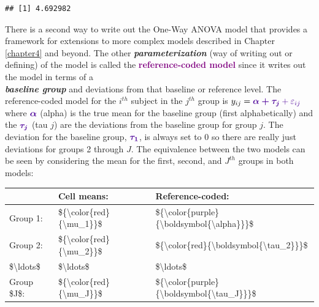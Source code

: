\documentclass[]{book}
\newenvironment{Shaded}{\begin{snugshade}}{\end{snugshade}}
\newcommand{\KeywordTok}[1]{\textcolor[rgb]{0.13,0.29,0.53}{\textbf{#1}}}
\newcommand{\OperatorTok}[1]{\textcolor[rgb]{0.81,0.36,0.00}{\textbf{#1}}}
\newcommand{\NormalTok}[1]{#1}
\theoremstyle{definition}
\theoremstyle{definition}
\theoremstyle{remark}
\begin{document}
\begin{Shaded}
\end{Shaded}

\begin{verbatim}
## [1] 4.692982
\end{verbatim}

There is a second way to write out the One-Way ANOVA model that provides
a framework for extensions to more complex models described in Chapter
\ref{chapter4} and beyond. The other \textbf{\emph{parameterization}}
(way of writing out or defining) of the model is called the
\textcolor{purple}{\textbf{reference-coded model}} since it writes out
the model in terms of a\\
\textbf{\emph{baseline group}} and deviations from that baseline or
reference level. The reference-coded model for the \(i^{th}\) subject in
the \(j^{th}\) group is
\(y_{ij} =\color{purple}{\boldsymbol{\alpha + \tau_j}}+\varepsilon_{ij}\)
where \(\color{purple}{\boldsymbol{\alpha}}\) (alpha) is the true mean
for the baseline group (first alphabetically) and the
\(\color{purple}{\boldsymbol{\tau_j}}\) (tau \(j\)) are the deviations
from the baseline group for group \(j\). The deviation for the baseline
group, \(\color{purple}{\boldsymbol{\tau_1}}\), is always set to 0 so
there are really just deviations for groups 2 through \(J\). The
equivalence between the two models can be seen by considering the mean
for the first, second, and \(J^{th}\) groups in both models:

\begin{tabular}{l|l|l}
\hline
 & Cell means: & Reference-coded:\\
\hline
Group 1: & \$\{\textbackslash{}color\{red\}\{\textbackslash{}mu\_1\}\}\$ & \$\{\textbackslash{}color\{purple\}\{\textbackslash{}boldsymbol\{\textbackslash{}alpha\}\}\}\$\\
\hline
Group 2: & \$\{\textbackslash{}color\{red\}\{\textbackslash{}mu\_2\}\}\$ & \$\{\textbackslash{}color\{red\}\{\textbackslash{}boldsymbol\{\textbackslash{}tau\_2\}\}\}\$\\
\hline
\$\textbackslash{}ldots\$ & \$\textbackslash{}ldots\$ & \$\textbackslash{}ldots\$\\
\hline
Group \$J\$: & \$\{\textbackslash{}color\{red\}\{\textbackslash{}mu\_J\}\}\$ & \$\{\textbackslash{}color\{purple\}\{\textbackslash{}boldsymbol\{\textbackslash{}tau\_J\}\}\}\$\\
\hline
\end{tabular}
\end{document}

